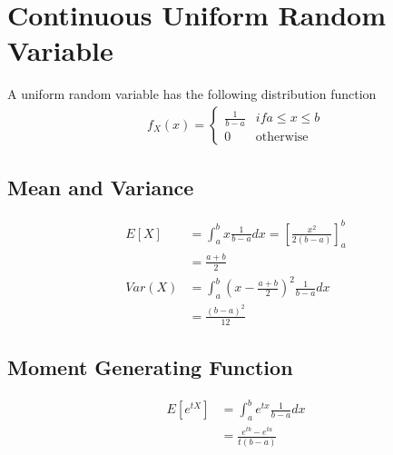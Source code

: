 \documentclass[../../probability-notes.tex]{subfiles}
\begin{document}
    \section{Continuous Uniform Random Variable}
    A uniform random variable has the following distribution function
    \begin{align*}
        f_{X}(x) = \begin{cases} \frac{1}{b-a} &\mbox{$if a \leq x \leq b$}\\
                                    0 &\mbox{otherwise} \end{cases}
    \end{align*}

    \subsection{Mean and Variance}
    \begin{align*}
        E[X] &= \int_{a}^{b} x \frac{1}{b-a} dx = [\frac{x^{2}}{2(b-a)}]_{a}^{b}\\
            &= \frac{a+b}{2}\\
        Var(X) &= \int_{a}^{b} (x - \frac{a+b}{2})^{2} \frac{1}{b-a} dx \\
            &= \frac{(b-a)^{2}}{12}
    \end{align*}

    \subsection{Moment Generating Function}
    \begin{align*}
        E[e^{tX}] &= \int_{a}^{b} e^{tx} \frac{1}{b-a} dx\\
        &= \frac{e^{tb} - e^{ta}}{t(b-a)}
    \end{align*}
\end{document}
